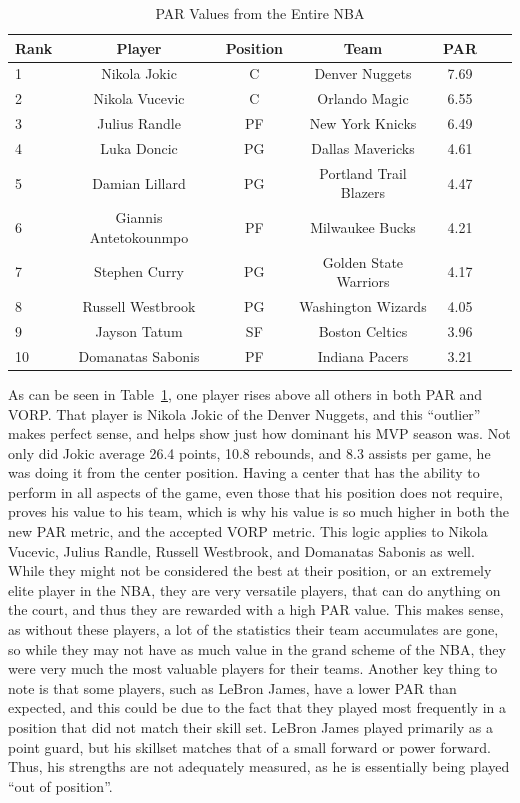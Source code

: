 \documentclass[12pt]{article}
\begin{document}
\begin{table}[H]
  \caption{PAR Values from the Entire NBA}
  \label{tab:NBAtable}
\centering
\begin{tabular}[t]{lcccccc}
  \toprule
  Rank & Player & Position & Team & PAR\\
  \midrule
 1 & Nikola Jokic & C & Denver Nuggets & 7.69\\
 2 & Nikola Vucevic & C & Orlando Magic & 6.55\\
 3 & Julius Randle & PF & New York Knicks & 6.49\\
 4 & Luka Doncic & PG & Dallas Mavericks & 4.61\\
 5 & Damian Lillard & PG & Portland Trail Blazers & 4.47\\
 6 & Giannis Antetokounmpo & PF & Milwaukee Bucks & 4.21\\
 7 & Stephen Curry & PG & Golden State Warriors & 4.17\\
 8 & Russell Westbrook & PG & Washington Wizards & 4.05\\
 9 & Jayson Tatum & SF & Boston Celtics & 3.96\\
 10 & Domanatas Sabonis & PF & Indiana Pacers & 3.21\\
 \bottomrule
\end{tabular}
\end{table}

As can be seen in Table~\ref{tab:NBAtable}, one player rises above all 
others in 
both PAR and VORP. 
That player is Nikola Jokic of the 
Denver Nuggets, and this ``outlier'' makes perfect sense, and helps show 
just how dominant his MVP 
season was. Not only did Jokic average 26.4 points, 10.8 rebounds, and 
8.3 assists per game, he was 
doing it from the center position. Having a center that has the ability to 
perform in all aspects of the game, 
even those that his position does not require, proves his value to his 
team, which is why his value is so 
much higher in both the new PAR metric, and the accepted VORP metric. 
This logic applies to Nikola 
Vucevic, Julius Randle, Russell Westbrook, and Domanatas Sabonis as 
well. While they might not be 
considered the best at their position, or an extremely elite player in the 
NBA, they are very versatile players, 
that can do anything on the court, and thus they are rewarded with a high 
PAR value. This makes sense, as 
without these players, a lot of the statistics their team accumulates are 
gone, so while they may not have as 
much value in the grand scheme of the NBA, they were very much the 
most valuable players for their 
teams. Another key thing to note is that some players, such as LeBron 
James, have a lower PAR than 
expected, and this could be due to the fact that they played most 
frequently in a position that did not match 
their skill set. LeBron James played primarily as a point guard, but his 
skillset matches that of a small 
forward or power forward. Thus, his strengths are not adequately 
measured, as he is essentially being 
played ``out of position''.
\end{document}
